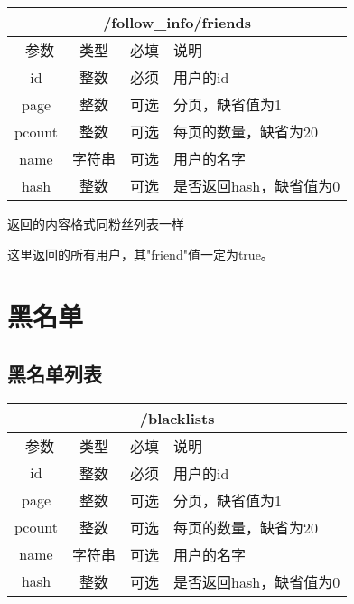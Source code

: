 \documentclass[cs4size]{ctexartutf8}
\begin{document}
\begin{table}[H]
   \begin{center}
\begin{tabular}{|c|c|c|p{12cm}|}
\hline
\multicolumn{4}{|c|}{/follow\_info/friends} \\
\hline\hline
 \  参数  & 类型 & 必填 &  说明  \\
\hline
 id  & 整数 & 必须 &  用户的id\\
   \hline
 page  & 整数 & 可选 & 分页，缺省值为1\\ 
 \hline
 pcount  & 整数 & 可选 & 每页的数量，缺省为20\\ 
     \hline
 name  & 字符串 & 可选 & 用户的名字\\ 
     \hline
 hash  & 整数 & 可选 & 是否返回hash，缺省值为0\\ 
\hline

\end{tabular}
   \end{center}
\end{table}

返回的内容格式同粉丝列表一样

这里返回的所有用户，其"friend"值一定为true。



\section{黑名单}
\subsection{黑名单列表}

\begin{table}[H]
   \begin{center}
\begin{tabular}{|c|c|c|p{12cm}|}
\hline
\multicolumn{4}{|c|}{/blacklists} \\
\hline\hline
 \  参数  & 类型 & 必填 &  说明  \\
\hline
 id  & 整数 & 必须 &  用户的id\\
   \hline
 page  & 整数 & 可选 & 分页，缺省值为1\\ 
 \hline
 pcount  & 整数 & 可选 & 每页的数量，缺省为20\\ 
     \hline
 name  & 字符串 & 可选 & 用户的名字\\ 
     \hline
 hash  & 整数 & 可选 & 是否返回hash，缺省值为0\\ 
\hline
\end{tabular}
   \end{center}
\end{table}
\end{document}
